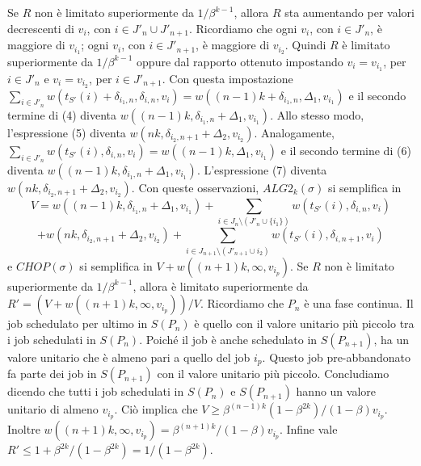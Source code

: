 \documentclass[12pt]{article}
\begin{document}
Se $R$ non è limitato superiormente da $1 / \beta^{k-1}$, allora $R$ sta aumentando per valori decrescenti di $v_{i}$, con $i \in J'_{n} \cup J'_{n+1}$. Ricordiamo che ogni $v_{i}$, con $i \in J'_{n}$, è maggiore di $v_{i_{1}}$; ogni $v_{i}$, con $i \in J'_{n+1}$, è maggiore di $v_{i_{2}}$. Quindi $R$ è limitato superiormente da $1 / \beta^{k-1}$ oppure dal rapporto ottenuto impostando $v_{i} = v_{i_{1}}$, per $i \in J'_{n}$ e $v_{i} = v_{i_{2}}$, per $i \in J'_{n+1}$. Con questa impostazione $\sum_{i \in J'_{n}} w(t_{S'}(i) + \delta_{i_{1},n}, \delta_{i,n}, v_{i}) = w ((n -1) k + \delta_{i_{1},n}, \Delta_{1}, v_{i_{1}})$ e il secondo termine di (4) diventa $w((n - 1) k, \delta_{i_{1},n} + \Delta_{1}, v_{i_{1}})$. Allo stesso modo, l'espressione (5) diventa $w (nk, \delta_{i_{2}, n+1} + \Delta_{2}, v_{i_{2}})$. Analogamente, $\sum_{i\in J'_{n}} w (t_{S'}(i), \delta_{i,n}, v_{i}) = w ((n -1) k, \Delta_{1}, v_{i_{1}})$ e il secondo termine di (6) diventa $w ((n - 1 ) k, \delta_{i_{1},n} + \Delta_{1}, v_{i_{1}})$.
L'espressione (7) diventa $w (nk, \delta_{i_{2}, n+1} + \Delta_{2}, v_{i_{2}})$. Con queste osservazioni, $ALG2_{k} (\sigma)$ si semplifica in
$$V = w ((n - 1) k, \delta_{i_{1},n} + \Delta_{1}, v_{i_{1}}) + \sum_{i\in J_{n} \setminus (J'_{n}\cup \{i_{1}\})} w(t_{S'} (i), \delta_{i,n}, v_{i})$$
$$+ w (nk, \delta_{i_{2}, n+1} + \Delta_{2}, v_{i_{2}}) + \sum_{i \in J_{n+1} \setminus (J'_{n+1} \cup {i_{2}})} w(t_{S'} (i), \delta_{i,n+1}, v_{i})$$
e $CHOP(\sigma)$ si semplifica in $V + w ((n + 1) k, \infty, v_{i_{p}})$. Se $R$ non è limitato superiormente da $1 / \beta^{k-1}$, allora è limitato superiormente da $R' = (V + w ((n + 1) k, \infty, v_{i_{p}})) / V$. Ricordiamo che $P_{n}$ è una fase continua. Il job schedulato per ultimo in $S(P_{n})$ è quello con il valore unitario più piccolo tra i job schedulati in $S(P_{n})$. Poiché il job è anche schedulato in $S(P_{n + 1})$, ha un valore unitario che è almeno pari a quello del job $i_{p}$. Questo job pre-abbandonato fa parte dei job in $S (P_{n + 1})$ con il valore unitario più piccolo. Concludiamo dicendo che tutti i job schedulati in $S (P_{n})$ e $S (P_{n + 1})$ hanno un valore unitario di almeno $v_{i_{p}}$. Ciò implica che $V \geq \beta^{(n - 1) k} (1 - \beta^{2k}) / (1 - \beta) v_{i_{p}}$. Inoltre $w ((n + 1) k, \infty, v_{i_{p}}) = \beta^{(n + 1) k} / (1 - \beta) v_{i_{p}}$. Infine vale $R' \leq 1 + \beta^{2k} / (1 - \beta^{2k}) = 1 / (1 - \beta^{2k}).$
\end{document}
